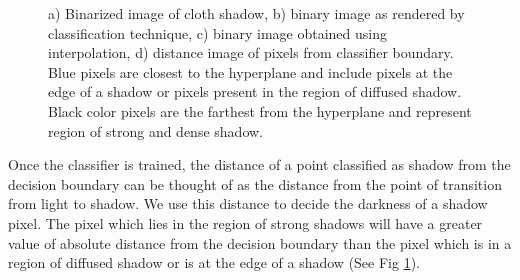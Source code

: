 \begin{figure}[h]
{\label{fig:subfig3} }   \caption{a) Binarized image of cloth shadow, b) binary
image as rendered by classification technique, c) binary image obtained using
interpolation, d) distance image of pixels from classifier boundary. Blue pixels
are closest to the hyperplane and include pixels at the edge of a shadow or
pixels present in the region of diffused shadow. Black color pixels are the
farthest from the hyperplane and represent region of strong and dense shadow.}
\label{fig:classify}
\end{figure}
Once the classifier is trained, the distance of a point classified as shadow
from the decision boundary can be thought of as the distance from the point of
transition from light to shadow. We use this distance to decide the darkness of
a shadow pixel. The pixel which lies in the region of strong shadows will have a
greater value of absolute distance from the decision boundary than the pixel
which is in a region of diffused shadow or is at the edge of a shadow (See
Fig \ref{fig:classify}).



